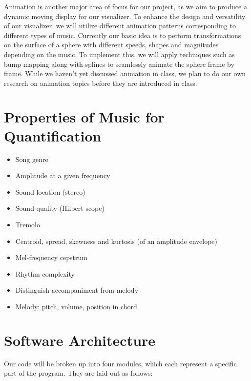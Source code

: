 \documentclass{article}
\begin{document}
Animation is another major area of focus for our project, as we aim to produce a dynamic moving display for our visualizer. To enhance the design and versatility of our visualizer, we will utilize different animation patterns corresponding to different types of music. Currently our basic idea is to perform transformations on the surface of a sphere with different speeds, shapes and magnitudes depending on the music. To implement this, we will apply techniques such as bump mapping along with splines to seamlessly animate the sphere frame by frame. While we haven’t yet discussed animation in class, we plan to do our own research on animation topics before they are introduced in class.

\section{Properties of Music for Quantification}

\begin{itemize}
	\item Song genre
	\item Amplitude at a given frequency
	\item Sound location (stereo)
	\item Sound quality (Hilbert scope)
	\item Tremolo
	\item Centroid, spread, skewness and kurtosis (of an amplitude envelope)
	\item Mel-frequency cepstrum
	\item Rhythm complexity
	\item Distinguish accompaniment from melody
	\item Melody: pitch, volume, position in chord
\end{itemize}

\section{Software Architecture}

Our code will be broken up into four modules, which each represent a specific part of the program. They are laid out as follows: \\
\end{document}
